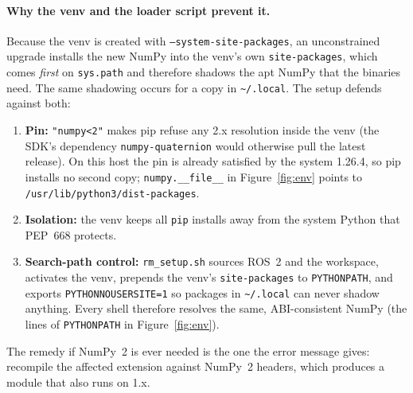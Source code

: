 \documentclass[11pt,a4paper]{article}
\begin{document}
\paragraph{Why the venv and the loader script prevent it.} Because the venv is created with \texttt{--system-site-packages}, an unconstrained upgrade installs the new NumPy into the venv's own \texttt{site-packages}, which comes \emph{first} on \texttt{sys.path} and therefore shadows the apt NumPy that the binaries need. The same shadowing occurs for a copy in \texttt{\textasciitilde/.local}. The setup defends against both:
\begin{enumerate}
  \item \textbf{Pin:} \texttt{"numpy<2"} makes pip refuse any 2.x resolution inside the venv (the SDK's dependency \texttt{numpy-quaternion} would otherwise pull the latest release). On this host the pin is already satisfied by the system 1.26.4, so pip installs no second copy; \texttt{numpy.\_\_file\_\_} in Figure~\ref{fig:env} points to \texttt{/usr/lib/python3/dist-packages}.
  \item \textbf{Isolation:} the venv keeps all \texttt{pip} installs away from the system Python that PEP~668 protects.
  \item \textbf{Search-path control:} \texttt{rm\_setup.sh} sources ROS~2 and the workspace, activates the venv, prepends the venv's \texttt{site-packages} to \texttt{PYTHONPATH}, and exports \texttt{PYTHONNOUSERSITE=1} so packages in \texttt{\textasciitilde/.local} can never shadow anything. Every shell therefore resolves the same, ABI-consistent NumPy (the lines of \texttt{PYTHONPATH} in Figure~\ref{fig:env}).
\end{enumerate}
The remedy if NumPy~2 is ever needed is the one the error message gives: recompile the affected extension against NumPy~2 headers, which produces a module that also runs on 1.x.
\end{document}
